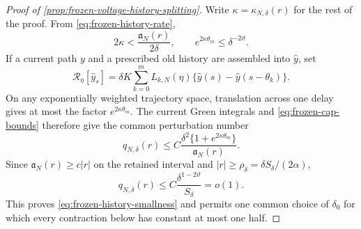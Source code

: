 \begin{proof}[Proof of \cref{prop:frozen-voltage-history-splitting}]
Write \(\kappa=\kappa_{N,\delta}(r)\) for the rest of the proof.  From
\cref{eq:frozen-history-rate},
\begin{equation}
 2\kappa<\frac{\mathfrak a_N(r)}{2\delta},\qquad
 e^{2\kappa\theta_m}\le\delta^{-2\vartheta}.        \label{eq:frozen-cap-bounds}
\end{equation}
If a current path \(y\) and a prescribed old history are assembled into
\(\widehat y\), set
\begin{equation}
 \mathcal R_\eta[\widehat y_s]
 =\delta K\sum_{k=0}^mL_{k,N}(\eta)
       \{\widehat y(s)-\widehat y(s-\theta_k)\}.     \label{eq:frozen-delay-operator}
\end{equation}
On any exponentially weighted trajectory space, translation across one
delay gives at most the factor \(e^{2\kappa\theta_m}\).  The current Green
integrals and \cref{eq:frozen-cap-bounds} therefore give the common
perturbation number
\begin{equation}
 q_{N,\delta}(r)
 \le C\frac{\delta^2
       \{1+e^{2\kappa\theta_m}\}}{\mathfrak a_N(r)}.
                                                               \label{eq:frozen-LP-number}
\end{equation}
Since \(\mathfrak a_N(r)\ge c|r|\) on the retained interval and
\(|r|\ge\rho_\delta=\delta S_\delta/(2\alpha)\),
\begin{equation}
 q_{N,\delta}(r)
 \le C\frac{\delta^{1-2\vartheta}}{S_\delta}=o(1).  \label{eq:frozen-LP-small}
\end{equation}
This proves \cref{eq:frozen-history-smallness} and permits one common choice
of \(\delta_0\) for which every contraction below has constant at most
one half.


\end{proof}
